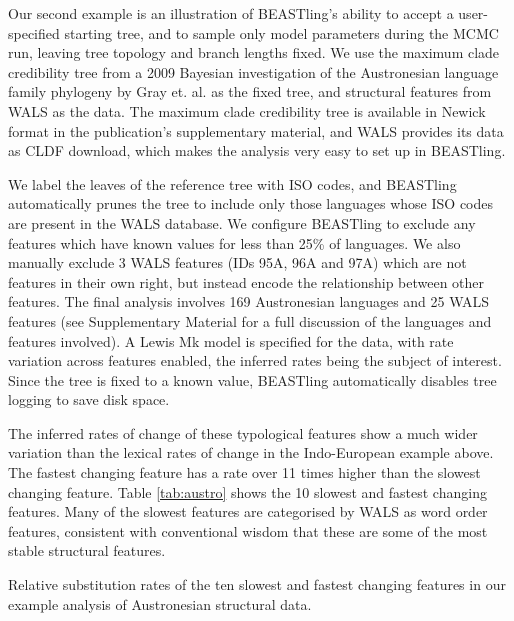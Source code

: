 \documentclass[twocolumn,10pt]{scrartcl}
\begin{document}
Our second example is an illustration of BEASTling's ability to accept a user-specified starting tree, and to sample only model parameters during the MCMC run, leaving tree topology and branch lengths fixed.  We use the maximum clade credibility tree from a 2009 Bayesian investigation of the Austronesian language family phylogeny by Gray et. al.\cite{Gray2009} as the fixed tree, and structural features from WALS \cite{wals} as the data.
The maximum clade credibility tree is available in Newick format in the publication's supplementary material,
and WALS provides its data as CLDF download,
which makes the analysis very easy to set up in BEASTling.

We label the leaves of the reference tree with ISO codes, and BEASTling automatically prunes the tree to include only those languages whose ISO codes are present in the WALS database.  We configure BEASTling to exclude any features which have known values for less than 25\% of languages.  We also manually exclude 3 WALS features (IDs 95A, 96A and 97A) which are not features in their own right, but instead encode the relationship between other features.  The final analysis involves 169 Austronesian languages and 25 WALS features (see Supplementary Material for a full discussion of the languages and features involved).  A Lewis Mk model is specified for the data, with rate variation across features enabled, the inferred rates being the subject of interest.  Since the tree is fixed to a known value, BEASTling automatically disables tree logging to save disk space.

The inferred rates of change of these typological features show a much wider variation than the lexical rates of change in the Indo-European example above.  The fastest changing feature has a rate over 11 times higher than the slowest changing feature.  Table \ref{tab:austro} shows the 10 slowest and fastest changing features.  Many of the slowest features are categorised by WALS as word order features, consistent with conventional wisdom that these are some of the most stable structural features.

\begin{table*}[ht]
	\begin{center}
		
	\end{center}
	\caption{Relative substitution rates of the ten slowest and fastest changing features in our example analysis of Austronesian structural data.}
\label{tab:austro}
\end{table*}
\end{document}
